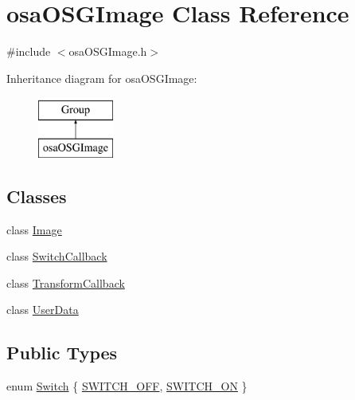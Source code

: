 \hypertarget{classosa_o_s_g_image}{}\section{osa\+O\+S\+G\+Image Class Reference}
\label{classosa_o_s_g_image}


{\ttfamily \#include $<$osa\+O\+S\+G\+Image.\+h$>$}

Inheritance diagram for osa\+O\+S\+G\+Image\+:\begin{figure}[H]
\begin{center}
\leavevmode
\includegraphics[height=2.000000cm]{de/dae/classosa_o_s_g_image}
\end{center}
\end{figure}
\subsection*{Classes}
\begin{DoxyCompactItemize}
\item 
class \hyperlink{classosa_o_s_g_image_1_1_image}{Image}
\item 
class \hyperlink{classosa_o_s_g_image_1_1_switch_callback}{Switch\+Callback}
\item 
class \hyperlink{classosa_o_s_g_image_1_1_transform_callback}{Transform\+Callback}
\item 
class \hyperlink{classosa_o_s_g_image_1_1_user_data}{User\+Data}
\end{DoxyCompactItemize}
\subsection*{Public Types}
\begin{DoxyCompactItemize}
\item 
enum \hyperlink{classosa_o_s_g_image_a2da87cd46b5af72c4a2d1b1a97122d01}{Switch} \{ \hyperlink{classosa_o_s_g_image_a2da87cd46b5af72c4a2d1b1a97122d01a1340fd4d4a70cd80b1a5704db3b0adc7}{S\+W\+I\+T\+C\+H\+\_\+\+O\+F\+F}, 
\hyperlink{classosa_o_s_g_image_a2da87cd46b5af72c4a2d1b1a97122d01a4d07c9ccd9f97187e1d2a0cd7b01353b}{S\+W\+I\+T\+C\+H\+\_\+\+O\+N}
 \}
\end{DoxyCompactItemize}
